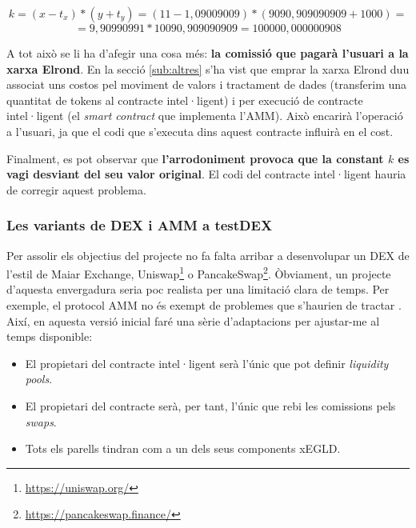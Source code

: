 \documentclass[11pt,a4paper]{article}
\begin{document}
\[k = (x - t_x) * (y + t_y) = (11 - 1,09009009) * (9090,909090909  + 1000) =\]
\[= 9,90990991 * 10090,909090909 = 100000,000000908\]

A tot això se li ha d'afegir una cosa més: \textbf{la comissió que pagarà l'usuari a la xarxa Elrond}. En la secció \ref{sub:altres} s'ha vist que emprar la xarxa Elrond duu associat uns costos pel moviment de valors i tractament de dades (transferim una quantitat de tokens al contracte intel·ligent) i per execució de contracte intel·ligent (el \textit{smart contract} que implementa l'AMM). Això encarirà l'operació a l'usuari, ja que el codi que s'executa dins aquest contracte influirà en el cost.

Finalment, es pot observar que \textbf{l'arrodoniment provoca que la constant \(k\) es vagi desviant del seu valor original}. El codi del contracte intel·ligent hauria de corregir aquest problema.

\subsubsection{Les variants de DEX i AMM a testDEX}
Per assolir els objectius del projecte no fa falta arribar a desenvolupar un DEX de l'estil de Maiar Exchange, Uniswap\footnote{\url{https://uniswap.org/}} o PancakeSwap\footnote{\url{https://pancakeswap.finance/}}. Òbviament, un projecte d'aquesta envergadura seria poc realista per una limitació clara de temps. Per exemple, el protocol AMM no és exempt de problemes que s'haurien de tractar \cite{vuterin2018}. Així, en aquesta versió inicial faré una sèrie d'adaptacions per ajustar-me al temps disponible:
\begin{itemize}
\item El propietari del contracte intel·ligent serà l'únic que pot definir \textit{liquidity pools}.
\item El propietari del contracte serà, per tant, l'únic que rebi les comissions pels \textit{swaps}.
\item Tots els parells tindran com a un dels seus components xEGLD.
\end{itemize}
\end{document}
